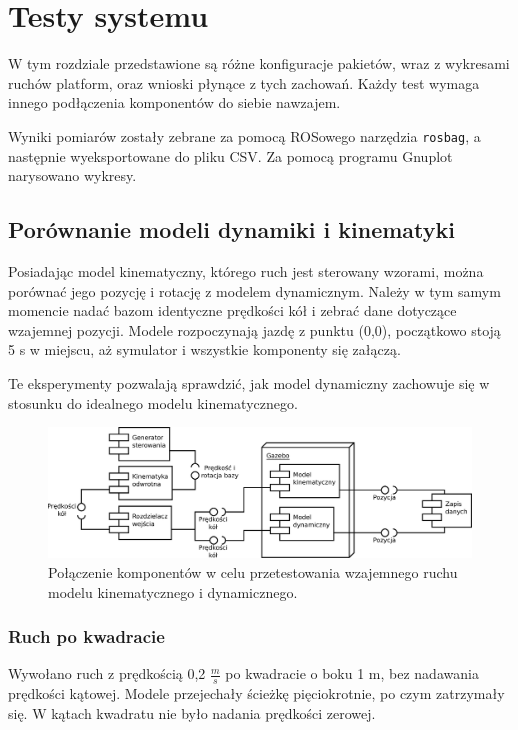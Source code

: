 \chapter{Testy systemu}
\label{sec:tests}
W tym rozdziale przedstawione są różne konfiguracje pakietów, wraz z wykresami ruchów platform, oraz wnioski płynące z tych zachowań.
Każdy test wymaga innego podłączenia komponentów do siebie nawzajem.

Wyniki pomiarów zostały zebrane za pomocą ROSowego narzędzia \texttt{rosbag}, a następnie wyeksportowane do pliku CSV. Za pomocą programu Gnuplot narysowano wykresy.

\section{Porównanie modeli dynamiki i kinematyki}
	Posiadając model kinematyczny, którego ruch jest sterowany wzorami, można porównać jego pozycję i rotację z modelem dynamicznym.
	Należy w tym samym momencie nadać bazom identyczne prędkości kół i zebrać dane dotyczące wzajemnej pozycji.
	Modele rozpoczynają jazdę z punktu (0,0), początkowo stoją 5 s w miejscu, aż symulator i wszystkie komponenty się załączą.
	
	Te eksperymenty pozwalają sprawdzić, jak model dynamiczny zachowuje się w stosunku do idealnego modelu kinematycznego.
	
	\begin{figure}[H]
		\centering
		\includegraphics[width=\textwidth]{uml/gramofon.pdf}
			\caption{Połączenie komponentów w celu przetestowania wzajemnego ruchu modelu kinematycznego i dynamicznego.}
		\label{uml:gramofon}
	\end{figure}
	
	\subsection{Ruch po kwadracie}
		Wywołano ruch z prędkością 0,2 $\frac{m}{s}$ po kwadracie o boku 1 m, bez nadawania prędkości kątowej.
		Modele przejechały ścieżkę pięciokrotnie, po czym zatrzymały się. W kątach kwadratu nie było nadania prędkości zerowej.
		
